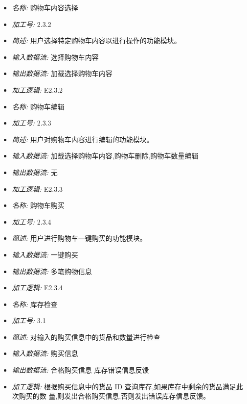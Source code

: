 \documentclass{article}
\begin{document}
\begin{CJK*}{UTF8}{gbsn}
\begin{itemize}
\end{itemize}


\vspace{-1mm}


\begin{itemize}
\item \textit{名称: }购物车内容选择
\item \textit{加工号: }2.3.2 
\item \textit{简述: }用户选择特定购物车内容以进行操作的功能模块。 
\item \textit{输入数据流: }选择购物车内容 
\item \textit{输出数据流: }加载选择购物车内容
\item \textit{加工逻辑: }E2.3.2

\end{itemize}


\vspace{-1mm}


\begin{itemize}
\item \textit{名称: }购物车编辑
\item \textit{加工号: }2.3.3
\item \textit{简述: }用户对购物车内容进行编辑的功能模块。 
\item \textit{输入数据流: }加载选择购物车内容,购物车删除,购物车数量编辑 
\item \textit{输出数据流: }无
\item \textit{加工逻辑: }E2.3.3

\end{itemize}


\vspace{-1mm}


\begin{itemize}
\item \textit{名称: }购物车购买
\item \textit{加工号: }2.3.4 
\item \textit{简述: }用户进行购物车一键购买的功能模块。 
\item \textit{输入数据流: }一键购买 
\item \textit{输出数据流: }多笔购物信息 
\item \textit{加工逻辑: }E2.3.4

\end{itemize}


\vspace{-1mm}


\begin{itemize}
\item \textit{名称: }库存检查
\item \textit{加工号: }3.1
\item \textit{简述: }对输入的购买信息中的货品和数量进行检查
\item \textit{输入数据流: }购买信息
\item \textit{输出数据流: }合格购买信息 库存错误信息反馈
\item \textit{加工逻辑: }根据购买信息中的货品 ID 查询库存,如果库存中剩余的货品满足此次购买的数 量,则发出合格购买信息,否则发出错误库存信息反馈。


\end{itemize}
\end{CJK*}
\end{document}
